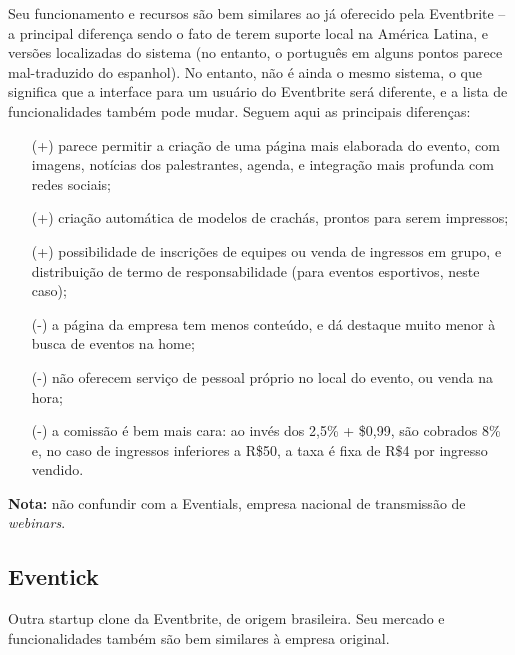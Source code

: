 \documentclass[12pt,a4paper,twoside,hyphens,english,brazil]{abntex2}
\begin{document}
Seu funcionamento e recursos são bem similares ao já oferecido pela Eventbrite -- a principal diferença sendo o fato de terem suporte local na América Latina, e versões localizadas do sistema (no entanto, o português em alguns pontos parece mal-traduzido do espanhol). No entanto, não é ainda o mesmo sistema, o que significa que a interface para um usuário do Eventbrite será diferente, e a lista de funcionalidades também pode mudar. Seguem aqui as principais diferenças:
\begin{itemize}[itemsep=-0.5ex]
	\item[(+)] parece permitir a criação de uma página mais elaborada do evento, com imagens, notícias dos palestrantes, agenda, e integração mais profunda com redes sociais;
	\item[(+)] criação automática de modelos de crachás, prontos para serem impressos;
	\item[(+)] possibilidade de inscrições de equipes ou venda de ingressos em grupo, e distribuição de termo de responsabilidade (para eventos esportivos, neste caso);
	\item[(-)] a página da empresa tem menos conteúdo, e dá destaque muito menor à busca de eventos na home;
	\item[(-)] não oferecem serviço de pessoal próprio no local do evento, ou venda na hora;
	\item[(-)] a comissão é bem mais cara: ao invés dos 2,5\% + \$0,99, são cobrados 8\% e, no caso de ingressos inferiores a R\$50, a taxa é fixa de R\$4 por ingresso vendido.
\end{itemize}

\begin{framed}
	\centering
	\textbf{Nota:} não confundir com a Eventials, empresa nacional de transmissão de \emph{webinars}.
\end{framed}

\subsection{Eventick}
Outra startup clone da Eventbrite, de origem brasileira. Seu mercado e funcionalidades também são bem similares à empresa original.
\end{document}

